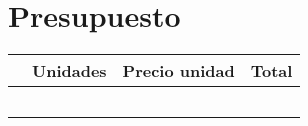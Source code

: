 

\newpage

\chapter{Presupuesto}
\label{chap:presupuesto}

\begin{table}[H]
  \begin{center}
    \begin{tabular}{|p{8cm}|p{2cm}|p{2cm}|p{2cm}|}
      \hline
      \vspace{+0.2in}{\textbf{Descripción}} & {\textbf{Unidades}} & {\textbf{Precio \EUR{} unidad }} & {\textbf{Total \EUR{}}}\\
      \hline
      \vspace{+0.2in}{Raspberry Pi 3 Modelo B} &  \vspace{+0.2in}{1} &  \vspace{+0.2in}{38,70} &  \vspace{+0.2in}{38,70}\\
      \hline
      \vspace{+0.2in}{Arduino Mega} & \vspace{+0.2in}{1} &  \vspace{+0.2in}{38,70} &  \vspace{+0.2in}{35,98}\\
      \hline      
      \vspace{+0.2in}{Arduino Sensor kit} & \vspace{+0.2in}{1} &  \vspace{+0.2in}{38,70} &  \vspace{+0.2in}{25,00}\\
      \hline
      \vspace{+0.2in}{Cámara USB alta definición} &  \vspace{+0.2in}{1} &  \vspace{+0.2in}{39,90} &  \vspace{+0.2in}{39,90}\\
      \hline
      \vspace{+0.2in}{Tarjeta de expansión con batería de Litio para Raspberry Pi} &  \vspace{+0.2in}{1} &  \vspace{+0.2in}{16,99} &  \vspace{+0.2in}{16,99}\\

\end{tabular}
\end{center}
\end{table}
